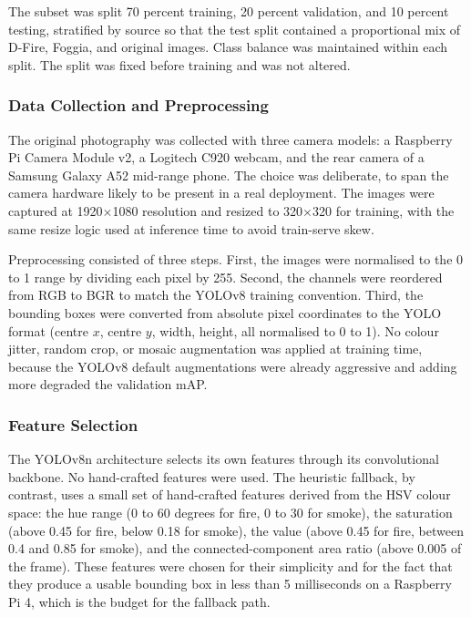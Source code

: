 The subset was split 70 percent training, 20 percent validation, and 10 percent testing, stratified by source so that the test split contained a proportional mix of D-Fire, Foggia, and original images. Class balance was maintained within each split. The split was fixed before training and was not altered.

\subsubsection{Data Collection and Preprocessing}

The original photography was collected with three camera models: a Raspberry Pi Camera Module v2, a Logitech C920 webcam, and the rear camera of a Samsung Galaxy A52 mid-range phone. The choice was deliberate, to span the camera hardware likely to be present in a real deployment. The images were captured at 1920$\times$1080 resolution and resized to 320$\times$320 for training, with the same resize logic used at inference time to avoid train-serve skew.

Preprocessing consisted of three steps. First, the images were normalised to the 0 to 1 range by dividing each pixel by 255. Second, the channels were reordered from RGB to BGR to match the YOLOv8 training convention. Third, the bounding boxes were converted from absolute pixel coordinates to the YOLO format (centre $x$, centre $y$, width, height, all normalised to 0 to 1). No colour jitter, random crop, or mosaic augmentation was applied at training time, because the YOLOv8 default augmentations were already aggressive and adding more degraded the validation mAP.

\subsubsection{Feature Selection}

The YOLOv8n architecture selects its own features through its convolutional backbone. No hand-crafted features were used. The heuristic fallback, by contrast, uses a small set of hand-crafted features derived from the HSV colour space: the hue range (0 to 60 degrees for fire, 0 to 30 for smoke), the saturation (above 0.45 for fire, below 0.18 for smoke), the value (above 0.45 for fire, between 0.4 and 0.85 for smoke), and the connected-component area ratio (above 0.005 of the frame). These features were chosen for their simplicity and for the fact that they produce a usable bounding box in less than 5 milliseconds on a Raspberry Pi 4, which is the budget for the fallback path.

